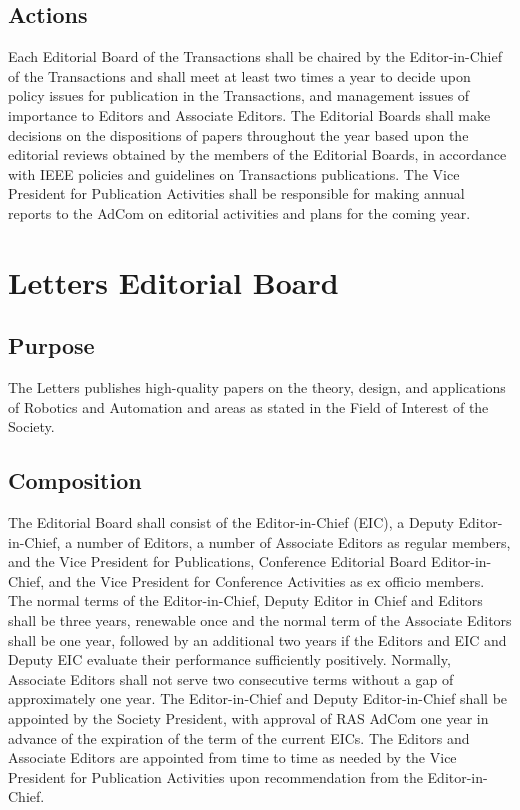 \documentclass[10pt]{article}
\begin{document}
\subsection{Actions}

Each Editorial Board of the Transactions shall be chaired by the Editor-in-Chief of the Transactions and shall meet at least two times a year to decide upon policy issues for publication in the Transactions, and management issues of importance to Editors and Associate Editors.  The Editorial Boards shall make decisions on the dispositions of papers throughout the year based upon the editorial reviews obtained by the members of the Editorial Boards, in accordance with IEEE policies and guidelines on Transactions publications. The Vice President for Publication Activities shall be responsible for making annual reports to the AdCom on editorial activities and plans for the coming year. 


\section{Letters Editorial Board}
\label{LEB}

\subsection{Purpose}
The Letters publishes high-quality papers on the theory, design, and applications of Robotics and Automation and areas as stated in the Field of Interest of the Society.


\subsection{Composition}
\label{LEB:Composition}

The Editorial Board shall consist of the Editor-in-Chief (EIC), a Deputy Editor-in-Chief, a number of Editors, a number of Associate Editors as regular members, and the Vice President for Publications, Conference Editorial Board Editor-in-Chief, and the Vice President for Conference Activities as ex officio members.  The normal terms of the Editor-in-Chief, Deputy Editor in Chief and Editors shall be three years, renewable once and the normal term of the Associate Editors shall be one year, followed by an additional two years if the Editors and EIC and Deputy EIC evaluate their performance sufficiently positively. Normally, Associate Editors shall not serve two consecutive terms without a gap of approximately one year.  The Editor-in-Chief and Deputy Editor-in-Chief shall be appointed by the Society President, with approval of RAS AdCom one year in advance of the expiration of the term of the current EICs. The Editors and Associate Editors are appointed from time to time as needed by the Vice President for Publication Activities upon recommendation from the Editor-in-Chief.
\end{document}
